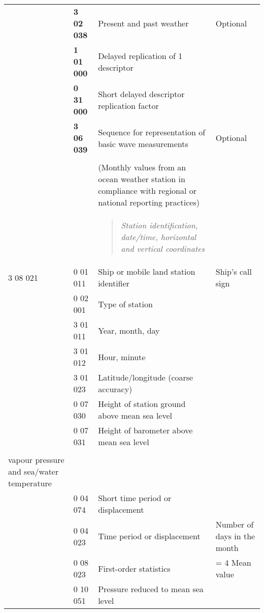 \begin{longtable}[]{@{}llll@{}}
& \textbf{3 02 038} & Present and past weather & Optional\tabularnewline
& \textbf{1 01 000} & Delayed replication of 1 descriptor &\tabularnewline
& \textbf{0 31 000} & Short delayed descriptor replication factor &\tabularnewline
& \textbf{3 06 039} & Sequence for representation of basic wave measurements & Optional\tabularnewline
& & &\tabularnewline
& & (Monthly values from an ocean weather station in compliance with regional or national reporting practices) &\tabularnewline
\begin{minipage}[t]{0.22\columnwidth}\raggedright
\strut
\end{minipage} & \begin{minipage}[t]{0.22\columnwidth}\raggedright
\strut
\end{minipage} & \begin{minipage}[t]{0.22\columnwidth}\raggedright
\begin{quote}
\emph{Station identification, date/time, horizontal and vertical coordinates}
\end{quote}\strut
\end{minipage} & \begin{minipage}[t]{0.22\columnwidth}\raggedright
\strut
\end{minipage}\tabularnewline
3 08 021 & 0 01 011 & Ship or mobile land station identifier & Ship's call sign\tabularnewline
& 0 02 001 & Type of station &\tabularnewline
& 3 01 011 & Year, month, day &\tabularnewline
& 3 01 012 & Hour, minute &\tabularnewline
& 3 01 023 & Latitude/longitude (coarse accuracy) &\tabularnewline
& 0 07 030 & Height of station ground above mean sea level &\tabularnewline
& 0 07 031 & Height of barometer above mean sea level &\tabularnewline
\begin{minipage}[t]{0.22\columnwidth}\raggedright
\strut
\end{minipage} & \begin{minipage}[t]{0.22\columnwidth}\raggedright
\strut
\end{minipage} & \begin{minipage}[t]{0.22\columnwidth}\raggedright
\begin{quote}
\emph{Monthly mean values of pressure, temperature,\\
vapour pressure and sea/water temperature}
\end{quote}\strut
\end{minipage} & \begin{minipage}[t]{0.22\columnwidth}\raggedright
\strut
\end{minipage}\tabularnewline
& 0 04 074 & Short time period or displacement &\tabularnewline
& 0 04 023 & Time period or displacement & Number of days in the month\tabularnewline
& 0 08 023 & First-order statistics & = 4 Mean value\tabularnewline
& 0 10 051 & Pressure reduced to mean sea level &\tabularnewline
\bottomrule
\end{longtable}

